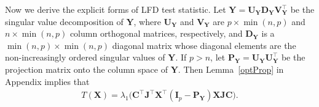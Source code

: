 \documentclass[12pt]{article} %
\newcommand{\bX}{\mathbf{X}}
\newcommand{\bP}{\mathbf{P}}
\newcommand{\bY}{\mathbf{Y}}
\newcommand{\bJ}{\mathbf{J}}
\newcommand{\bC}{\mathbf{C}}
\newcommand{\bI}{\mathbf{I}}
\newcommand{\bU}{\mathbf{U}}
\newcommand{\bD}{\mathbf{D}}
\newcommand{\bV}{\mathbf{V}}
\theoremstyle{definition}
\begin{document}
Now we derive the explicit forms of LFD test statistic. 
Let $\bY=\bU_{\bY}\bD_{\bY}\bV_{\bY}^\top$ be the singular value decomposition of $\bY$, where $\bU_{\bY}$ and $\bV_{\bY}$ are $p\times \min(n,p)$ and $n \times \min(n,p)$ column orthogonal matrices, respectively, and $\bD_{\bY}$ is a $\min(n,p)\times \min(n,p)$ diagonal matrix whose diagonal elements are the non-increasingly ordered singular values of $\bY$.
If $p>n$, let $\bP_{\bY}=\bU_{\bY}\bU_{\bY}^\top$ be the projection matrix onto the column space of $\bY$.
Then Lemma~\ref{optProp} in Appendix implies that
\begin{equation}\label{statisticForm1}
\begin{aligned}
    T(\bX)
    =\lambda_{1}\big(\bC^\top\bJ^\top\bX^\top (\bI_p-
    \bP_{\bY}
    )\bX\bJ\bC\big).
\end{aligned}
\end{equation}
\end{document}
